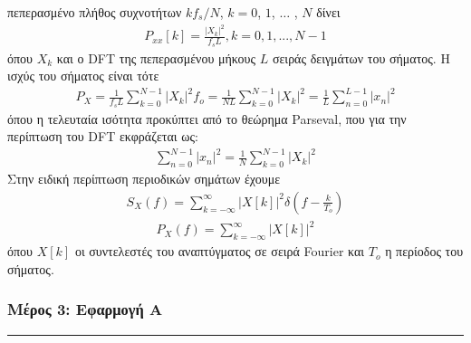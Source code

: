 \documentclass[letterpaper,10pt,english]{sphinxmanual}
\begin{document}
πεπερασμένο πλήθος συχνοτήτων \(kf_s/Ν\), \(k=0\), \(1\), \(…\) , \(Ν\) δίνει
\begin{equation*}
\begin{split}P_{xx}[k]=\frac{|X_k| ^2}{f_sL} , k=0, 1, ...,N-1\end{split}
\end{equation*}
\sphinxAtStartPar
όπου \(X_k\) και ο DFT της πεπερασμένου μήκους \(L\) σειράς δειγμάτων του σήματος. Η ισχύς του
σήματος είναι τότε
\begin{equation*}
\begin{split}P_{X}=\frac{1}{f_sL} \sum_{k=0}^{N-1} |X_k|^2f_o =\frac{1}{NL} \sum_{k=0}^{N-1} |X_k|^2 = \frac{1}{L}\sum_{n=0}^{L-1} |x_n|^2\end{split}
\end{equation*}
\sphinxAtStartPar
όπου η τελευταία ισότητα προκύπτει από το θεώρημα Parseval, που για την περίπτωση του DFT
εκφράζεται ως:
\begin{equation*}
\begin{split} \sum_{n=0}^{N-1} |x_n|^2 = \frac{1}{N} \sum_{k=0}^{N-1} |X_k|^2\end{split}
\end{equation*}
\sphinxAtStartPar
Στην ειδική περίπτωση περιοδικών σημάτων έχουμε
\begin{equation*}
\begin{split}S_X(f)=\sum_{k=-\infty}^{\infty} |X[k]|^2\delta(f-\frac{k}{T_o})\end{split}
\end{equation*}\begin{equation*}
\begin{split}P_X(f)=\sum_{k=-\infty}^{\infty} |X[k]|^2\end{split}
\end{equation*}
\sphinxAtStartPar
όπου \(X[k]\) οι συντελεστές του αναπτύγματος σε σειρά Fourier και \(T_o\) η περίοδος του σήματος.


\subsubsection*{Μέρος 3:  Εφαρμογή Α}
\label{\detokenize{Exercise1_3:id1}}\label{\detokenize{Exercise1_3::doc}}

\bigskip\hrule\bigskip
\end{document}
